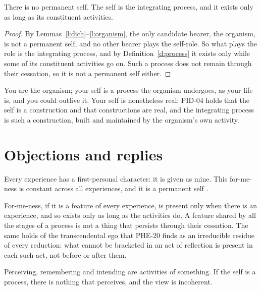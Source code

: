 \documentclass{situationist-preprint}
\begin{document}
\begin{theorem}\label{t:main}
There is no permanent self. The self is the integrating process, and it exists only as long as its constituent activities.
\end{theorem}

\begin{proof}
By Lemmas~\ref{l:dich}--\ref{l:organism}, the only candidate bearer, the organism, is not a permanent self, and no other bearer plays the self-role. So what plays the role is the integrating process, and by Definition~\ref{d:process} it exists only while some of its constituent activities go on. Such a process does not remain through their cessation, so it is not a permanent self either.
\end{proof}

You are the organism; your self is a process the organism undergoes, as your life is, and you could outlive it. Your self is nonetheless real: PID-04 holds that the self is a construction and that constructions are real, and the integrating process is such a construction, built and maintained by the organism's own activity.

\section{Objections and replies}

\begin{objection}
Every experience has a first-personal character: it is given as mine. This for-me-ness is constant across all experiences, and it is a permanent self \citep{Zahavi2005}.
\end{objection}

\begin{reply}
For-me-ness, if it is a feature of every experience, is present only when there is an experience, and so exists only as long as the activities do. A feature shared by all the stages of a process is not a thing that persists through their cessation. The same holds of the transcendental ego that PHE-20 finds as an irreducible residue of every reduction: what cannot be bracketed in an act of reflection is present in each such act, not before or after them.
\end{reply}

\begin{objection}
Perceiving, remembering and intending are activities of something. If the self is a process, there is nothing that perceives, and the view is incoherent.
\end{objection}
\end{document}
